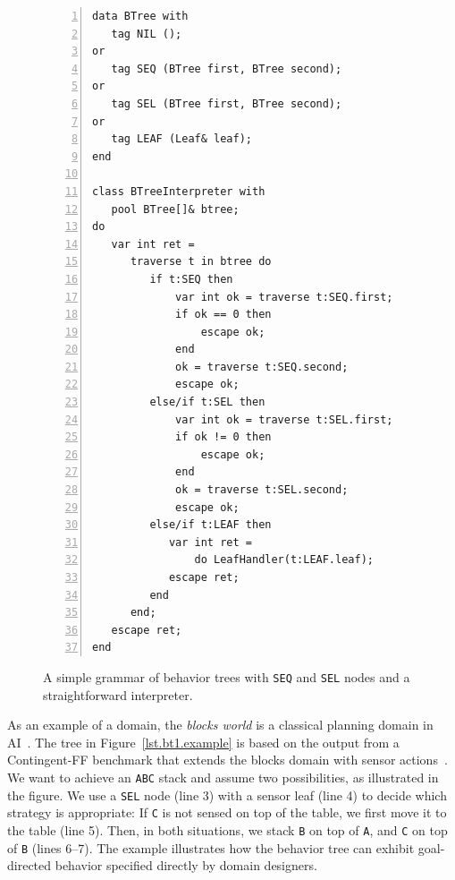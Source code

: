 \documentclass{sig-alternate}
\newcommand{\CEU}{\textsc{C\'{e}u}\xspace}
\newcommand{\code}[1] {{\small{\texttt{#1}}}}
\begin{document}
\begin{figure}[t]
\begin{lstlisting}[numbers=left,xleftmargin=3em]
data BTree with
   tag NIL ();
or
   tag SEQ (BTree first, BTree second);
or
   tag SEL (BTree first, BTree second);
or
   tag LEAF (Leaf& leaf);
end

class BTreeInterpreter with
   pool BTree[]& btree;
do
   var int ret =
      traverse t in btree do
         if t:SEQ then
             var int ok = traverse t:SEQ.first;
             if ok == 0 then
                 escape ok;
             end
             ok = traverse t:SEQ.second;
             escape ok;
         else/if t:SEL then
             var int ok = traverse t:SEL.first;
             if ok != 0 then
                 escape ok;
             end
             ok = traverse t:SEL.second;
             escape ok;
         else/if t:LEAF then
            var int ret =
                do LeafHandler(t:LEAF.leaf);
            escape ret;
         end
      end;
   escape ret;
end
\end{lstlisting}
\caption{
A simple grammar of behavior trees with \code{SEQ} and \code{SEL} nodes and a 
straightforward interpreter.
\label{lst.bt1}
}
\end{figure}

As an example of a domain, the \emph{blocks world} is a classical planning 
domain in AI~\cite{slaney2001blocks}.
%
The tree in Figure~\ref{lst.bt1.example} is based on the output from a
Contingent-FF benchmark that extends the blocks domain with sensor 
actions~\cite{hoffmann2005contingent}.
%
%
We want to achieve an \code{ABC} stack and assume two possibilities, as 
illustrated in the figure.
%
We use a \code{SEL} node (line 3) with a sensor leaf (line 4) to decide which 
strategy is appropriate:
If \code{C} is not sensed on top of the table, we first move it to the table 
(line 5).
Then, in both situations, we stack \code{B} on top of \code{A}, and \code{C} on 
top of \code{B} (lines 6--7).
%
%
The example illustrates how the behavior tree can exhibit goal-directed 
behavior specified directly by domain designers.
%
\end{document}

